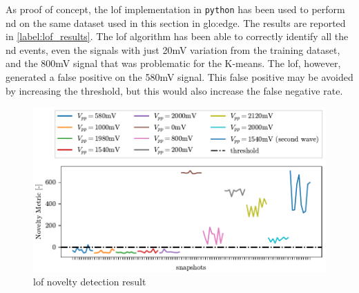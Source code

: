 As proof of concept, the \gls{lof} implementation in \texttt{python} has been used to perform \gls{nd} on the same dataset used in this section in \gls{glo:edge}. The results are reported in \autoref{label:lof_results}. The \gls{lof} algorithm has been able to correctly identify all the \gls{nd} events, even the signals with just 20mV variation from the training dataset, and the 800mV signal that was problematic for the K-means. The \gls{lof}, however, generated a false positive on the 580mV signal. This false positive may be avoided by increasing the threshold, but this would also increase the false negative rate. 

\begin{figure}
    \centering
    \includegraphics{Images/shaker/Test02_LOF.pdf}
    \caption{\gls{lof} novelty detection result}
    \label{fig:lof_results}
\end{figure}